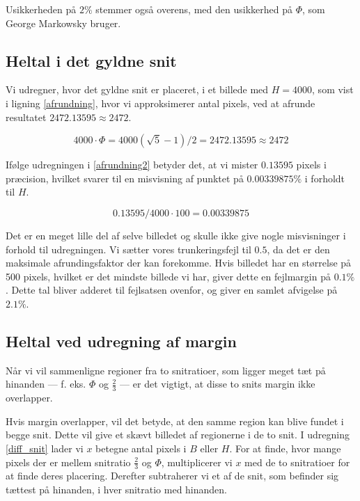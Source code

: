 {Usikkerheden på $2\%$ stemmer også overens, med den usikkerhed
på $\varPhi$, som George Markowsky bruger\cite{Markowsky1992}.

\subsection{Heltal i det gyldne snit}
Vi udregner, hvor det gyldne snit er placeret, i et billede med $H =
4000$, som vist i ligning \eqref{afrundning}, hvor vi approksimerer
antal pixels, ved at afrunde resultatet $2472.13595 \approx 2472$.

\begin{equation}
    4000 \cdot \varPhi = 4000(\sqrt{5}-1)/2 = 2472.13595 \approx 2472
    \label{afrundning}
\end{equation}

Ifølge udregningen i \eqref{afrundning2} betyder det, at vi mister
$0.13595$ pixels i præcision, hvilket svarer til en misvisning af
punktet på $0.00339875\%$ i forholdt til $H$.

\begin{equation}
    0.13595/4000 \cdot 100 = 0.00339875
    \label{afrundning2}
\end{equation}

Det er en meget lille del af selve billedet og skulle ikke give nogle
misvisninger i forhold til udregningen. Vi sætter vores trunkeringsfejl
til $0.5$, da det er den maksimale afrundingsfaktor der kan forekomme.
Hvis billedet har en størrelse på 500 pixels, hvilket er det mindste
billede vi har, giver dette en fejlmargin på $0.1 \%$. Dette tal bliver
adderet til fejlsatsen ovenfor, og giver en samlet afvigelse på $2.1\%$.

\subsection{Heltal ved udregning af margin}
Når vi vil sammenligne regioner fra to snitratioer,  som
ligger meget tæt på hinanden --- f. eks.  $\varPhi$ og $\frac{2}{3}$ ---
er det vigtigt, at disse to snits margin ikke overlapper.

Hvis margin overlapper, vil det betyde, at den samme region kan blive
fundet i begge snit. Dette vil give et skævt billedet af regionerne i de
to snit.  I udregning \ref{diff_snit} lader vi $x$ betegne
antal pixels i $B$ eller $H$. For at finde, hvor mange pixels der er
mellem snitratio $\frac{2}{3}$ og $\varPhi$, multiplicerer vi $x$ med de
to snitratioer for at finde deres placering. Derefter subtraherer vi et
af de snit, som befinder sig tættest på hinanden, i hver snitratio med
hinanden.

}
